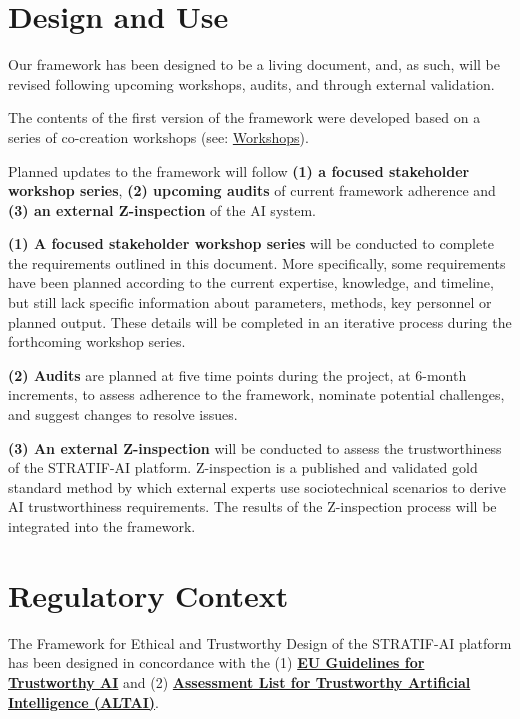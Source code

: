 \documentclass[
  letterpaper,
  DIV=11,
  numbers=noendperiod]{scrreport}
\begin{document}
\hypertarget{design-and-use}{%
\section*{Design and Use}\label{design-and-use}}


Our framework has been designed to be a living document, and, as such,
will be revised following upcoming workshops, audits, and through
external validation.

The contents of the first version of the framework were developed based
on a series of co-creation workshops (see:
\protect\hyperlink{co-creation-workshops}{Workshops}).

Planned updates to the framework will follow \textbf{(1) a focused
stakeholder workshop series}, \textbf{(2) upcoming audits} of current
framework adherence and \textbf{(3) an external Z-inspection} of the AI
system.

\textbf{(1) A focused stakeholder workshop series} will be conducted to
complete the requirements outlined in this document. More specifically,
some requirements have been planned according to the current expertise,
knowledge, and timeline, but still lack specific information about
parameters, methods, key personnel or planned output. These details will
be completed in an iterative process during the forthcoming workshop
series.

\textbf{(2) Audits} are planned at five time points during the project,
at 6-month increments, to assess adherence to the framework, nominate
potential challenges, and suggest changes to resolve issues.

\textbf{(3) An external Z-inspection} will be conducted to assess the
trustworthiness of the STRATIF-AI platform. Z-inspection is a published
and validated gold standard method by which external experts use
sociotechnical scenarios to derive AI trustworthiness requirements. The
results of the Z-inspection process will be integrated into the
framework.

\hypertarget{regulatory-context}{%
\section*{Regulatory Context}\label{regulatory-context}}


The Framework for Ethical and Trustworthy Design of the STRATIF-AI
platform has been designed in concordance with the (1)
\href{https://digital-strategy.ec.europa.eu/en/library/ethics-guidelines-trustworthy-ai}{\textbf{EU
Guidelines for Trustworthy AI}} and (2)
\href{https://digital-strategy.ec.europa.eu/en/library/assessment-list-trustworthy-artificial-intelligence-altai-self-assessment}{\textbf{Assessment
List for Trustworthy Artificial Intelligence (ALTAI)}}.
\end{document}
